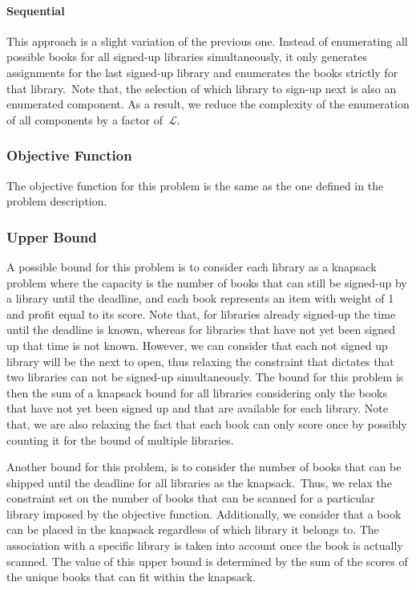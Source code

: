 \paragraph*{Sequential}

This approach is a slight variation of the previous one. Instead of enumerating
all possible books for all signed-up libraries simultaneously, it only generates
assignments for the last signed-up library and enumerates the books strictly for
that library.~Note that, the selection of which library to sign-up next is also
an enumerated component. As a result, we reduce the complexity of the
enumeration of all components by a factor of~$\mathcal{L}$.

\subsubsection*{Objective Function}

The objective function for this problem is the same as the one defined in the
problem description.

\subsubsection*{Upper Bound}

A possible bound for this problem is to consider each library as a knapsack
problem where the capacity is the number of books that can still be signed-up by
a library until the deadline, and each book represents an item with weight of 1
and profit equal to its score. Note that, for libraries already signed-up the
time until the deadline is known, whereas for libraries that have not yet been
signed up that time is not known. However, we can consider that each not signed
up library will be the next to open, thus relaxing the constraint that dictates
that two libraries can not be signed-up simultaneously. The bound for this
problem is then the sum of a knapsack bound for all libraries considering only
the books that have not yet been signed up and that are available for each
library. Note that, we are also relaxing the fact that each book can only score
once by possibly counting it for the bound of multiple libraries.

Another bound for this problem, is to consider the number of books that can be
shipped until the deadline for all libraries as the knapsack.~Thus, we relax the
constraint set on the number of books that can be scanned for a particular
library imposed by the objective function. Additionally, we consider that a book
can be placed in the knapsack regardless of which library it belongs to. The
association with a specific library is taken into account once the book is
actually scanned. The value of this upper bound is determined by the sum of the
scores of the unique books that can fit within the knapsack.


